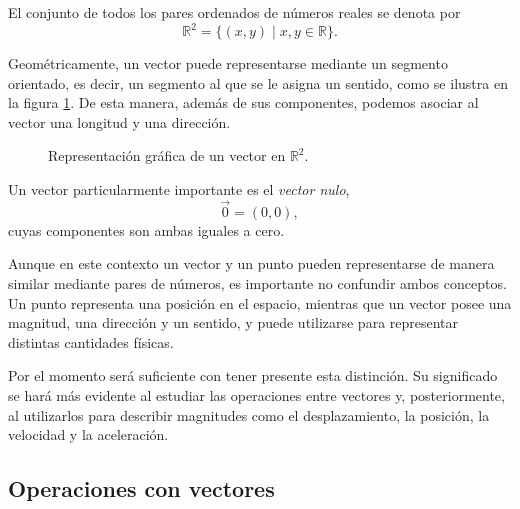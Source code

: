 El conjunto de todos los pares ordenados de números reales se denota por
\[
  \mathbb{R}^2
  =
  \{(x,y)\mid x,y\in\mathbb{R}\}.
\]

Geométricamente, un vector puede representarse mediante un segmento orientado, es decir, un segmento al que se le asigna un sentido, como se ilustra en la figura \ref{fig:vec_r2}. De esta manera, además de sus componentes, podemos asociar al vector una longitud y una dirección.

\begin{figure}[!ht]
  \centering 
  \caption{Representación gráfica de un vector en \(\mathbb{R}^2\).}
  \label{fig:vec_r2}
\end{figure}

Un vector particularmente importante es el \emph{vector nulo},
\[
  \vec{0}=(0,0),
\]
cuyas componentes son ambas iguales a cero.

Aunque en este contexto un vector y un punto pueden representarse de manera similar mediante pares de números, es importante no confundir ambos conceptos. Un punto representa una posición en el espacio, mientras que un vector posee una magnitud, una dirección y un sentido, y puede utilizarse para representar distintas cantidades físicas.

Por el momento será suficiente con tener presente esta distinción. Su significado se hará más evidente al estudiar las operaciones entre vectores y, posteriormente, al utilizarlos para describir magnitudes como el desplazamiento, la posición, la velocidad y la aceleración.

\subsection{Operaciones con vectores}
